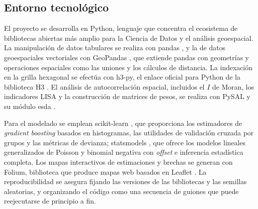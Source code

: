 \subsection{Entorno tecnológico}
\label{subsec:entorno-tecnologico}

El proyecto se desarrolla en Python, lenguaje que concentra el ecosistema de bibliotecas
abiertas más amplio para la Ciencia de Datos y el análisis geoespacial. La manipulación de
datos tabulares se realiza con pandas \parencite{mckinney2010}, y la de datos geoespaciales
vectoriales con GeoPandas \parencite{jordahl2020}, que extiende pandas con geometrías y
operaciones espaciales como las uniones y los cálculos de distancia. La indexación en la
grilla hexagonal se efectúa con h3-py, el enlace oficial para Python de la biblioteca H3
\parencite{h3-overview}. El análisis de autocorrelación espacial, incluidos el $I$ de Moran,
los indicadores LISA y la construcción de matrices de pesos, se realiza con PySAL y su
módulo esda \parencite{rey2007}.

Para el modelado se emplean scikit-learn \parencite{pedregosa2011}, que proporciona los
estimadores de \textit{gradient boosting} basados en histogramas, las utilidades de
validación cruzada por grupos y las métricas de devianza; statsmodels
\parencite{seabold2010}, que ofrece los modelos lineales generalizados de Poisson y binomial
negativa con \textit{offset} e inferencia estadística completa. Los mapas interactivos de
estimaciones y brechas se generan con Folium, biblioteca que produce mapas web basados en
Leaflet \parencite{folium}. La reproducibilidad se asegura fijando las versiones de las
bibliotecas y las semillas aleatorias, y organizando el código como una secuencia de guiones
que puede reejecutarse de principio a fin.

